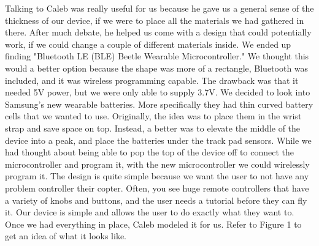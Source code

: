 \documentclass[12pt,letterpaper]{article}
\begin{document}
\hspace{1cm}Talking to Caleb was really useful for us because he gave us a general sense of the thickness of our device, if we were to place all the materials we had gathered in there. After much debate, he helped us come with a design that could potentially work, if we could change a couple of different materials inside. We ended up finding "Bluetooth LE (BLE) Beetle Wearable Microcontroller." We thought this would a better option because the shape was more of a rectangle, Bluetooth was included, and it was wireless programming capable. The drawback was that it needed 5V power, but we were only able to supply 3.7V. We decided to look into Samsung's new wearable batteries. More specifically they had thin curved battery cells that we wanted to use. Originally, the idea was to place them in the wrist strap and save space on top. Instead, a better was to elevate the middle of the device into a peak, and place the batteries under the track pad sensors. While we had thought about being able to pop the top of the device off to connect the microcontroller and program it, with the new microcontroller we could wirelessly program it. The design is quite simple because we want the user to not have any problem controller their copter. Often, you see huge remote controllers that have a variety of knobs and buttons, and the user needs a tutorial before they can fly it. Our device is simple and allows the user to do exactly what they want to.\\
Once we had everything in place, Caleb modeled it for us. Refer to Figure 1 to get an idea of what it looks like.
\end{document}
